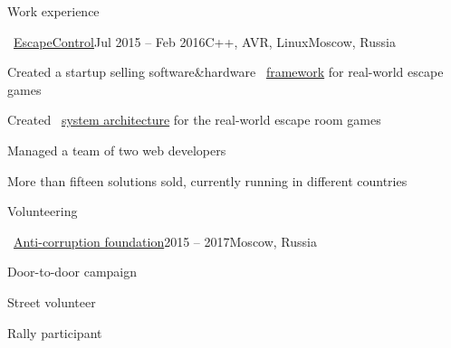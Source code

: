 \documentclass{resume} %
\begin{document}
\begin{rSection}{Work experience}

\begin{rSubsection}{\faExternalLink~\href{http://escapecontrol.ru/index_en.html}{EscapeControl}}{Jul 2015 -- Feb 2016}{C++, AVR, Linux}{Moscow, Russia}
	\item Created a startup selling software\&hardware \faExternalLink~\href{http://demo:demo@ec3.pagekite.escapecontrol.ru}{framework} for real-world escape games
	\item Created \faExternalLink~\href{http://habr.ru/p/258585/}{system architecture} for the real-world escape room games
	\item Managed a team of two web developers
	\item More than fifteen solutions sold, currently running in different countries
\end{rSubsection}


		
\end{rSection}

\begin{rSection}{Volunteering}
	\begin{rSubsection}{\faExternalLink~\href{https://fbk.info/english/about/}{Anti-corruption foundation}}{2015 -- 2017}{Moscow, Russia}{}
		\item Door-to-door campaign
		\item Street volunteer
		\item Rally participant
	\end{rSubsection}
\end{rSection}

\end{document}
